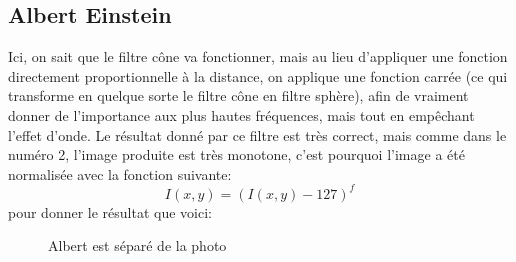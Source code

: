 \documentclass[12pt]{article}
\begin{document}
\subsection{Albert Einstein}
Ici, on sait que le filtre cône va fonctionner, mais au lieu d'appliquer une fonction directement proportionnelle à la distance, on applique une fonction carrée (ce qui transforme en quelque sorte le filtre cône en filtre sphère), afin de vraiment donner de l'importance aux plus hautes fréquences, mais tout en empêchant l'effet d'onde. Le résultat donné par ce filtre est très correct, mais comme dans le numéro 2, l'image produite est très monotone, c'est pourquoi l'image a été normalisée avec la fonction suivante:
\begin{equation}
  I(x, y) = (I(x, y) - 127)^f
\end{equation}
pour donner le résultat que voici:
\vspace{3cm}
\begin{figure}[ht]
  \centering
  \hspace{1cm}
  \captionsetup{width=.8\linewidth}
  \caption{Albert est séparé de la photo}
\end{figure}
\end{document}
